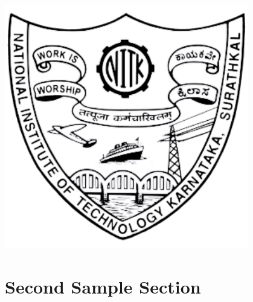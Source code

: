\documentclass[twoside]{report}
\numberwithin{equation}{section}		%
\numberwithin{figure}{section}			%
\numberwithin{table}{section}
\begin{document}
    \begin{minipage}{0.95\textwidth}
        \centering
        \captionsetup{type=figure}
        \includegraphics[width=0.8\textwidth,totalheight=\textheight,keepaspectratio]{nitklogo.png}
    \end{minipage}

    \section{Second Sample Section}
    \lipsum[1-3]
\end{document}
